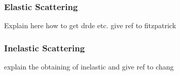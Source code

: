 \subsubsection{Elastic Scattering}
\label{subsubsec:Elastic}
Explain here how to get drde etc. give ref to fitzpatrick
\subsubsection{Inelastic Scattering}
\label{subsubsec:Inelastic}
explain the obtaining of inelastic and give ref to chang
